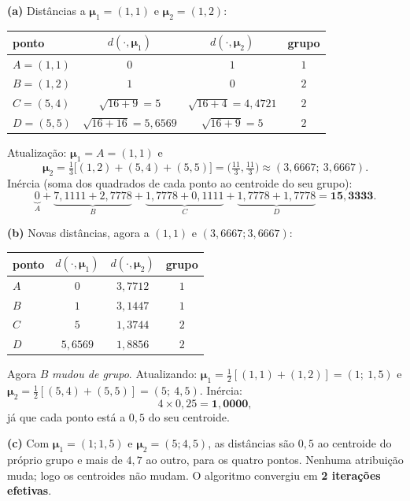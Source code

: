 \documentclass[11pt,a4paper]{article}
\begin{document}
\begin{solucao}
\textbf{(a)} Distâncias a $\bm\mu_1=(1,1)$ e $\bm\mu_2=(1,2)$:
\begin{center}\small
\renewcommand{\arraystretch}{1.25}
\begin{tabular}{@{}lccc@{}}
\toprule
ponto & $d(\cdot,\bm\mu_1)$ & $d(\cdot,\bm\mu_2)$ & grupo \\
\midrule
$A=(1,1)$ & $0$ & $1$ & $1$ \\
$B=(1,2)$ & $1$ & $0$ & $2$ \\
$C=(5,4)$ & $\sqrt{16+9}=5$ & $\sqrt{16+4}=4{,}4721$ & $2$ \\
$D=(5,5)$ & $\sqrt{16+16}=5{,}6569$ & $\sqrt{16+9}=5$ & $2$ \\
\bottomrule
\end{tabular}
\end{center}
Atualização: $\bm\mu_1 = A = (1,1)$ e
\[
  \bm\mu_2 = \tfrac13\big[(1,2)+(5,4)+(5,5)\big] = \Big(\tfrac{11}{3},\tfrac{11}{3}\Big)
  \approx (3{,}6667;\ 3{,}6667).
\]
Inércia (soma dos quadrados de cada ponto ao centroide do seu grupo):
\[
  \underbrace{0}_{A} + \underbrace{7{,}1111+2{,}7778}_{B} + \underbrace{1{,}7778+0{,}1111}_{C}
  + \underbrace{1{,}7778+1{,}7778}_{D} = \mathbf{15{,}3333}.
\]

\smallskip
\textbf{(b)} Novas distâncias, agora a $(1,1)$ e $(3{,}6667;3{,}6667)$:
\begin{center}\small
\begin{tabular}{@{}lccc@{}}
\toprule
ponto & $d(\cdot,\bm\mu_1)$ & $d(\cdot,\bm\mu_2)$ & grupo \\
\midrule
$A$ & $0$ & $3{,}7712$ & $1$ \\
$B$ & $1$ & $3{,}1447$ & $1$ \\
$C$ & $5$ & $1{,}3744$ & $2$ \\
$D$ & $5{,}6569$ & $1{,}8856$ & $2$ \\
\bottomrule
\end{tabular}
\end{center}
Agora $B$ \emph{mudou de grupo}. Atualizando:
$\bm\mu_1 = \tfrac12[(1,1)+(1,2)] = (1;\ 1{,}5)$ e
$\bm\mu_2 = \tfrac12[(5,4)+(5,5)] = (5;\ 4{,}5)$. Inércia:
\[
  4\times 0{,}25 = \mathbf{1{,}0000},
\]
já que cada ponto está a $0{,}5$ do seu centroide.

\smallskip
\textbf{(c)} Com $\bm\mu_1=(1;1{,}5)$ e $\bm\mu_2=(5;4{,}5)$, as distâncias são
$0{,}5$ ao centroide do próprio grupo e mais de $4{,}7$ ao outro, para os quatro
pontos. Nenhuma atribuição muda; logo os centroides não mudam. O algoritmo
convergiu em \textbf{2 iterações efetivas}.


\end{solucao}
\end{document}
